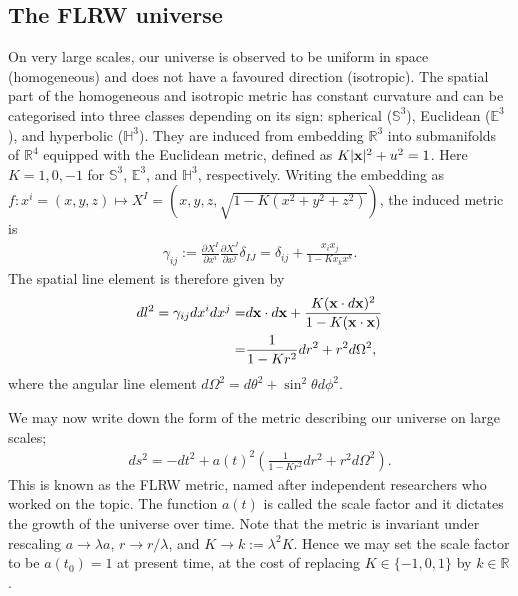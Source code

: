 \subsection{The FLRW universe}
On very large scales, our universe is observed to be uniform in space (homogeneous) and does not have a favoured direction (isotropic). The spatial part of the homogeneous and isotropic metric has constant curvature and can be categorised into three classes depending on its sign: spherical ($\mathbb{S}^3$), Euclidean ($\mathbb{E}^3$), and hyperbolic ($\mathbb{H}^3$). They are induced from embedding $\mathbb{R}^3$ into submanifolds of $\mathbb{R}^4$ equipped with the Euclidean metric, defined as $K|\mathbf{x}|^2 + u^2 = 1$. Here $K=1,0,-1$ for $\mathbb{S}^3$, $\mathbb{E}^3$, and $\mathbb{H}^3$, respectively. Writing the embedding as $f: x^i = (x,y,z) \mapsto X^I =(x,y,z,\sqrt{1-K(x^2+y^2+z^2)})$, the induced metric is
\begin{align}
	\gamma_{ij} := \frac{\partial X^I}{\partial x^i} \frac{\partial X^J}{\partial x^j} \delta_{IJ}
	= \delta_{ij} + \frac{x_i x_j}{1-Kx_k x^k}. \label{eqn:FLRW_metric_spatial}
\end{align}
The spatial line element is therefore given by
\begin{align}
	dl^2 = \gamma_{ij} dx^i dx^j =& d\mathbf{x} \cdot d\mathbf{x} + \frac{K(\mathbf{x} \cdot d\mathbf{x})^2}{1-K (\mathbf{x} \cdot \mathbf{x})} \\
	=& \frac{1}{1-Kr^2} dr^2 + r^2 d\Omega^2,
\end{align}
where the angular line element $d\Omega^2 = d\theta^2 + \sin^2\theta d\phi^2$.

We may now write down the form of the metric describing our universe on large scales;
\begin{align}
	ds^2 = - dt^2 + a(t)^2 \left( \frac{1}{1-Kr^2} dr^2 + r^2 d\Omega^2 \right).
\end{align}
This is known as the FLRW metric, named after independent researchers who worked on the topic. The function $a(t)$ is called the scale factor and it dictates the growth of the universe over time. Note that the metric is invariant under rescaling $a \rightarrow \lambda a$, $r \rightarrow r / \lambda$, and $K \rightarrow k:= \lambda^2 K$. Hence we may set the scale factor to be $a(t_0) = 1$ at present time, at the cost of replacing $K \in \{-1,0,1\}$ by $k \in \mathbb{R}$.

